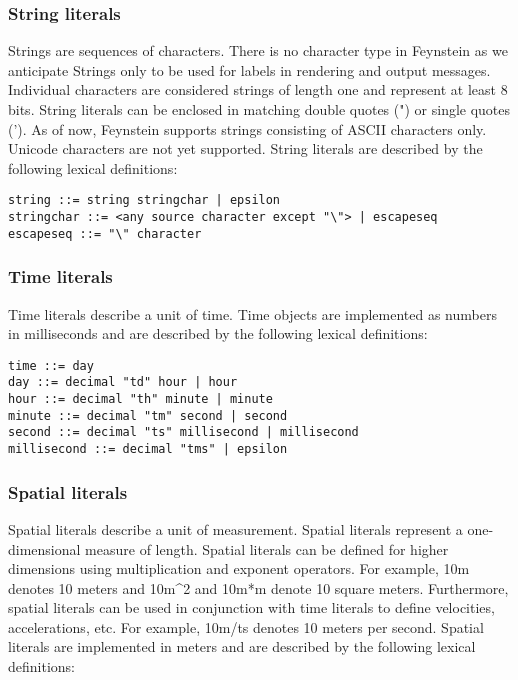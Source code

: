 \documentclass[letterpaper]{article}
\begin{document}
\subsubsection{String literals}

Strings are sequences of characters. There is no character type in
Feynstein as we anticipate Strings only to be used for labels in
rendering and output messages. Individual characters are considered
strings of length one and represent at least 8 bits. String literals
can be enclosed in matching double quotes (") or single quotes (').
As of now, Feynstein supports strings consisting of ASCII characters
only. Unicode characters are not yet supported. String literals are
described by the following lexical definitions:

\begin{verbatim}
string ::= string stringchar | epsilon
stringchar ::= <any source character except "\"> | escapeseq
escapeseq ::= "\" character
\end{verbatim}

\subsubsection{Time literals}
 
Time literals describe a unit of time. Time objects are implemented as
numbers in milliseconds and are described by the following lexical
definitions:

\begin{verbatim}
time ::= day
day ::= decimal "td" hour | hour
hour ::= decimal "th" minute | minute
minute ::= decimal "tm" second | second
second ::= decimal "ts" millisecond | millisecond 
millisecond ::= decimal "tms" | epsilon
\end{verbatim}

\subsubsection{Spatial literals}
 
Spatial literals describe a unit of measurement. Spatial literals
represent a one-dimensional measure of length. Spatial literals can be
defined for higher dimensions using multiplication and exponent
operators. For example, 10m denotes 10 meters and
10m\textasciicircum{}2 and 10m*m denote 10 square meters. Furthermore,
spatial literals can be used in conjunction with time literals to
define velocities, accelerations, etc. For example, 10m/ts denotes 10
meters per second. Spatial literals are implemented in meters and are
described by the following lexical definitions:
\end{document}
